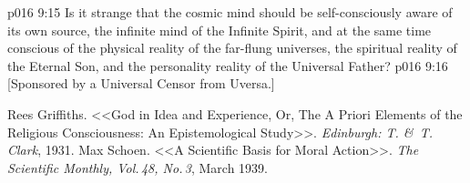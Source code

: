 \vs p016 9:15 Is it strange that the cosmic mind should be self\hyp{}consciously aware of its own source, the infinite mind of the Infinite Spirit, and at the same time conscious of the physical reality of the far\hyp{}flung universes, the spiritual reality of the Eternal Son, and the personality reality of the Universal Father?
\vsetoff
\vs p016 9:16 [Sponsored by a Universal Censor from Uversa.]
\quizlink
\begin{thebibliography}{100}
Rees Griffiths.
{<<God in Idea and Experience, Or, The A Priori Elements of the Religious Consciousness: An Epistemological Study>>.}
{\em Edinburgh: T. \&\ T. Clark}, 1931.
Max Schoen.
{<<A Scientific Basis for Moral Action>>.}
{\em The Scientific Monthly, Vol.\,48, No.\,3}, March 1939.
\end{thebibliography}
